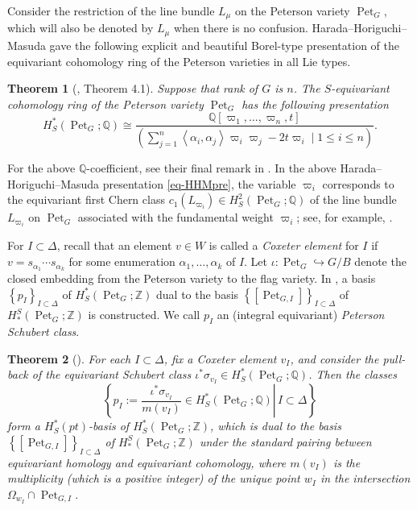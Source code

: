 \documentclass[11pt, letterpaper]{amsart}
\numberwithin{equation}{section}
\newtheorem{theorem}{Theorem}[section]
\DeclareMathOperator{\Pet}{Pet}
\begin{document}
Consider the restriction of the line bundle $L_{\mu}$ on the Peterson variety $\Pet_{G}$, which will also be denoted by $L_{\mu}$ when there is no confusion.  Harada--Horiguchi--Masuda \cite{harada2015equivariant} gave the following explicit and beautiful Borel-type presentation of the equivariant cohomology ring of the Peterson varieties in all Lie types. 

\begin{theorem}[\cite{harada2015equivariant}, Theorem 4.1] \label{thm-HHMpre}
    Suppose that rank of $G$ is $n$. The $S$-equivariant cohomology ring of the Peterson variety $\Pet_G$ has the following presentation
    \begin{equation}\label{eq-HHMpre}
H_S^*(\Pet_G; \mathbb{Q}) \cong \frac{\mathbb{Q}[\varpi_1, \ldots, \varpi_n,t]}{\left(\sum_{j=1}^n \left\langle \alpha_i, \alpha_j \right\rangle \varpi_i \varpi_j-2t\varpi_i \mid 1 \leq i \leq n \right)}.
\end{equation}
\end{theorem}

For the above $\mathbb{Q}$-coefficient, see their final remark in \cite{harada2015equivariant}. In the above Harada--Horiguchi--Masuda presentation \eqref{eq-HHMpre}, the variable $\varpi_{i}$ corresponds to 
the equivariant first Chern class $c_{1}(L_{\varpi_{i}})\in H_S^{2}(\Pet_{G};\mathbb{Q})$ of the line bundle $L_{\varpi_{i}}$ on $\Pet_{G}$ associated with the fundamental weight $\varpi_{i}$; see, for example, \cite[Section 6.5]{abe2023peterson}.

For $I \subset \Delta$, recall that an element $v \in W$ is called a \emph{Coxeter element} for $I$ if $v=s_{\alpha_1} \cdots s_{\alpha_k}$ for some enumeration $\alpha_1, \ldots, \alpha_k$ of $I$. Let $\iota: \Pet_{G} \hookrightarrow G / B$ denote the closed embedding from the Peterson variety to the flag variety. In \cite{Goldin2024positivity}, a basis $\left\{p_I\right\}_{I \subset \Delta}$ of $H_S^*(\Pet_{G};\mathbb{Z})$ dual to the basis $\left\{\left[\Pet_{G,I}\right]\right\}_{I \subset \Delta}$ of $H^S_*(\Pet_{G};\mathbb{Z})$ is constructed. We call $p_I$ an (integral equivariant) \emph{Peterson Schubert class}.

\begin{theorem}[] \label{thm-PSbasis}
    For each $I \subset \Delta$, fix a Coxeter element $v_I$, and consider the pull-back of the equivariant Schubert class $\iota^* \sigma_{v_I} \in H_S^*(\Pet_{G};\mathbb{Q})$. Then the classes 
    \begin{equation}\label{eq-PSclass}
      \left\{\left.p_I:=\frac{\iota^* \sigma_{v_I}}{m(v_I)} \in H_S^*(\Pet_{G};\mathbb{Q}) \right\rvert\, I \subset \Delta\right\} 
    \end{equation}
    form a $H_S^*(p t)$-basis of $H_S^*(\Pet_{G};\mathbb{Z})$, which is dual to the basis $\left\{\left[\Pet_{G,I}\right]\right\}_{I \subset \Delta}$ of $H^S_*(\Pet_{G};\mathbb{Z})$ under the standard pairing between equivariant homology and equivariant cohomology, where $m\left(v_I\right)$ is the multiplicity (which is a positive integer) of the unique point $w_I$ in the intersection $\Omega_{w_I} \cap \Pet_{G,I}$.
\end{theorem}
\end{document}

